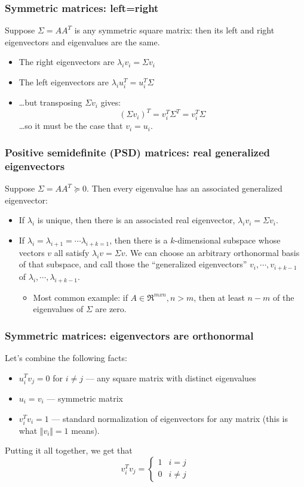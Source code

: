 \documentclass{beamer}
\begin{document}
\begin{frame}
  \frametitle{Symmetric matrices: left=right}

  Suppose $\Sigma=AA^T$ is any symmetric square matrix: then its left
  and right eigenvectors and eigenvalues are the same.
  \begin{itemize}
  \item The right eigenvectors are $\lambda_iv_i=\Sigma v_i$
  \item The left eigenvectors are $\lambda_i u_i^T = u_i^T \Sigma$
  \item \ldots but transposing $\Sigma v_i$ gives:
    \[
    (\Sigma v_i)^T = v_i^T\Sigma^T = v_i^T\Sigma
    \]
    \ldots so it must be the case that $v_i=u_i$.
  \end{itemize}
\end{frame}

\begin{frame}
  \frametitle{Positive semidefinite (PSD) matrices: real generalized eigenvectors}

  Suppose $\Sigma=AA^T\succeq 0$.  Then every eigenvalue has an
  associated generalized eigenvector:
  \begin{itemize}
  \item If $\lambda_i$ is unique, then there is an associated real
    eigenvector, $\lambda_iv_i = \Sigma v_i$.
  \item If $\lambda_i=\lambda_{i+1}=\cdots \lambda_{i+k=1}$, then
    there is a $k$-dimensional subspace whose vectors $v$ all satisfy
    $\lambda_iv =\Sigma v$.  We can choose an arbitrary
    orthonormal basis of that subspace, and call those the
    ``generalized eigenvectors'' $v_i,\cdots,v_{i+k-1}$ of
    $\lambda_i,\cdots,\lambda_{i+k-1}$.
    \begin{itemize}
    \item 
      Most common example: if $A\in\Re^{mxn},n>m$, then at least $n-m$
      of the eigenvalues of $\Sigma$ are zero.
    \end{itemize}
  \end{itemize}
\end{frame}

\begin{frame}
  \frametitle{Symmetric matrices: eigenvectors are orthonormal}
  Let's combine the following facts:
  \begin{itemize}
  \item ${u}_i^T{v}_j=0$ for $i\ne j$ --- any square matrix with distinct
    eigenvalues
  \item ${u}_i={v}_i$ --- symmetric matrix
  \item ${v}_i^T{v}_i=1$ --- standard normalization of
    eigenvectors for any matrix (this is what $\Vert{v}_i\Vert=1$ means).
  \end{itemize}
  Putting it all together, we get that
  \[
  {v}_i^T{v}_j=
  \begin{cases}
    1&i=j\\
    0&i\ne j
  \end{cases}
  \]
\end{frame}
\end{document}
